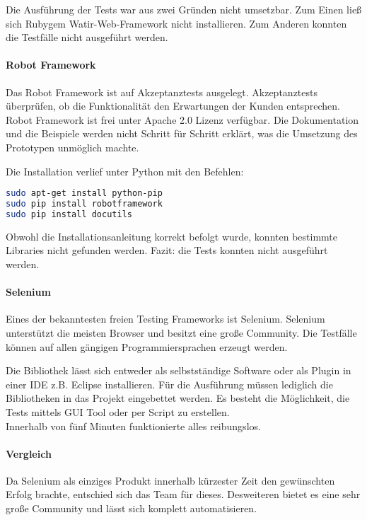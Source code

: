 Die Ausführung der Tests war aus zwei Gründen nicht umsetzbar. Zum Einen ließ sich Rubygem Watir-Web-Framework nicht installieren. Zum Anderen konnten die Testfälle nicht ausgeführt werden.

\paragraph{Robot Framework}
Das Robot Framework ist auf Akzeptanztests ausgelegt. Akzeptanztests überprüfen, ob die Funktionalität den Erwartungen der Kunden entsprechen.  Robot Framework ist frei unter Apache 2.0 Lizenz verfügbar. Die Dokumentation und die Beispiele werden nicht Schritt für Schritt erklärt, was die Umsetzung des Prototypen unmöglich machte. \cite{ROBOTFRAMEWORK}

Die Installation verlief unter Python mit den Befehlen:
\begin{lstlisting}[caption={Installation von Robot Framework \cite{ROBOTFRAMEWORKINSTALL}}, language=bash]
sudo apt-get install python-pip
sudo pip install robotframework
sudo pip install docutils
\end{lstlisting}

Obwohl die Installationsanleitung korrekt befolgt wurde, konnten bestimmte Libraries nicht gefunden werden. Fazit: die Tests konnten nicht ausgeführt werden. 
\paragraph{Selenium}
Eines der bekanntesten freien Testing Frameworks ist Selenium. Selenium unterstützt die meisten Browser und besitzt eine große Community. Die Testfälle können auf allen gängigen Programmiersprachen erzeugt werden.

Die Bibliothek lässt sich entweder als selbstständige Software oder als Plugin in einer IDE z.B. Eclipse installieren. Für die Ausführung müssen lediglich die Bibliotheken in das Projekt eingebettet werden. Es besteht die Möglichkeit, die Tests mittels GUI Tool oder per Script zu erstellen.\\
Innerhalb von fünf Minuten funktionierte alles reibungslos.

\paragraph{Vergleich}
Da Selenium als einziges Produkt innerhalb kürzester Zeit den gewünschten Erfolg brachte, entschied sich das Team für dieses. Desweiteren bietet es eine sehr große Community und lässt sich komplett automatisieren.